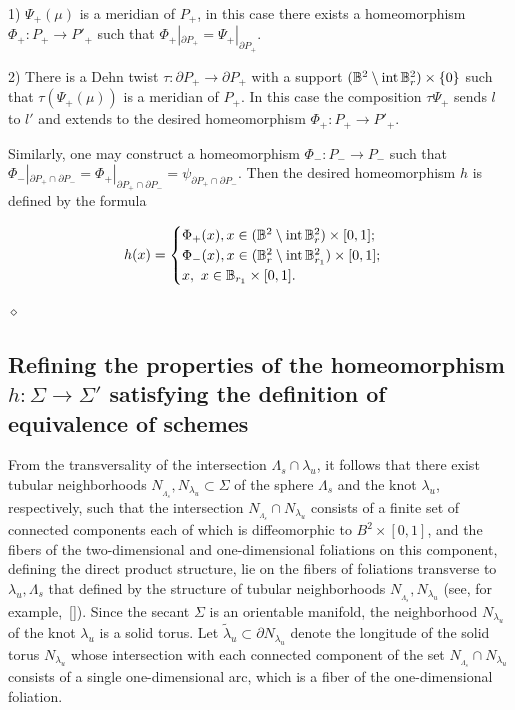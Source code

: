 \documentclass[%
 aip,
 amsmath,amssymb,
preprint,%
]{revtex4-1}
\newenvironment{proof}{{\bf Proof:}}
{\hfill $\diamond$\medskip}
\begin{document}
\begin{proof}
1)   $\Psi_+(\mu)$ is a meridian of $P_+$, in this case there exists a homeomorphism $\Phi_+: P_+\to P'_+$ such that $\Phi_+|_{\partial P_+}=\Psi_{+}|_{\partial P_+}$.

2) There is a Dehn twist $\tau: \partial P_+\to \partial P_+$ with a support $(\mathbb B^2\setminus {\rm int}\, \mathbb B^2_r)\times \{0\}$ such that
$\tau(\Psi_+(\mu))$ is  a meridian of $P_+$.  In this case the composition $\tau \Psi_+$ sends $l$ to $l'$ and  extends to the desired homeomorphism $\Phi_+: P_+\to P'_+$.

 Similarly, one may construct a homeomorphism $\Phi_-: P_-\to P_-$ such that $\Phi_-|_{\partial P_+\cap \partial P_-}=\Phi_+|_{\partial P_+\cap \partial P_-}=\psi_{\partial P_+\cap \partial P_-}$. Then the  desired homeomorphism $h$ is defined by the formula

\begin{equation}
h(x)=\begin{cases}\Phi_+(x), x\in (\mathbb B^2\setminus {\rm int}\, \mathbb B^2_{r}) \times [0,1];\cr
\Phi_-(x), x\in (\mathbb B^2_r\setminus {\rm int}\, \mathbb B^2_{r_1}) \times [0,1];\cr
x,\ x\in \mathbb B_{r_1}\times [0,1].\end{cases}
\end{equation}

\end{proof}

\subsection{Refining the properties of the homeomorphism $h: \Sigma\to \Sigma'$ satisfying the definition of equivalence of schemes}

From the transversality of the intersection $\Lambda_s\cap \lambda_u$, it follows that there exist tubular neighborhoods $N_{_{\Lambda_s}}, N_{\lambda_u}\subset \Sigma$ of the sphere $\Lambda_s$ and the knot $\lambda_u$, respectively, such that the intersection $N_{_{\Lambda_s}}\cap N_{\lambda_u}$ consists of a finite set of connected components each of which is diffeomorphic to $B^2\times [0,1]$, and the fibers of the two-dimensional and one-dimensional foliations on this component, defining the direct product structure, lie on the fibers of foliations transverse to $\lambda_u, \Lambda_s$ that defined by the structure of tubular neighborhoods $N_{_{\Lambda_s}}, N_{\lambda_u}$ (see, for example,~[]). Since the secant $\Sigma$ is an orientable manifold, the neighborhood $N_{\lambda_u}$ of the knot ${\lambda_u}$ is a solid torus. Let $\tilde \lambda_u\subset \partial N_{\lambda_u}$ denote the longitude  of the solid torus $N_{\lambda_u}$ whose intersection with each connected component of the set $N_{_{\Lambda_s}}\cap N_{\lambda_u}$ consists of a single one-dimensional arc, which is a fiber of the one-dimensional foliation.
\end{document}
